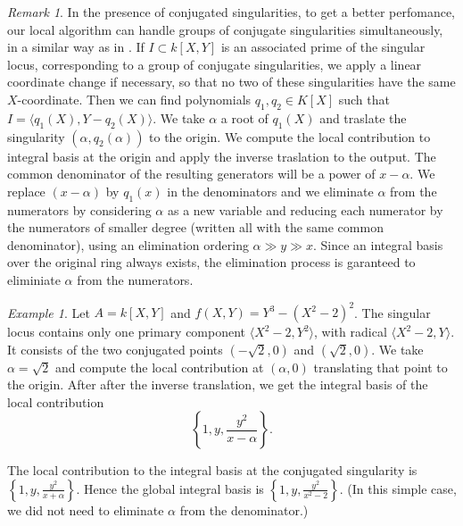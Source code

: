 \documentclass[a4paper,11pt]{amsart}%
\theoremstyle{definition}
\theoremstyle{plain}
\theoremstyle{remark}
\newtheorem{remark}[defn]{Remark}
\newtheorem{example}[defn]{Example}
\begin{document}
\begin{remark}
In the presence of conjugated singularities, to get a better perfomance, our
local algorithm can handle groups of conjugate singularities simultaneously,
in a similar way as in \cite[Section 4]{vanHoeij94}. If $I \subset k[X,Y]$ is
an associated prime of the singular locus, corresponding to a group of
conjugate singularities, we apply a linear coordinate change if necessary, so
that no two of these singularities have the same $X$-coordinate. Then we can
find polynomials $q_{1}, q_{2} \in K[X]$ such that $I = \langle q_{1}(X),
Y-q_{2}(X)\rangle$. We take $\alpha$ a root of $q_{1}(X)$ and traslate the
singularity $(\alpha, q_{2}(\alpha))$ to the origin. We compute the local
contribution to integral basis at the origin and apply the inverse traslation
to the output. The common denominator of the resulting generators will be a
power of $x - \alpha$. We replace $(x-\alpha)$ by $q_{1}(x)$ in the
denominators and we eliminate $\alpha$ from the numerators by considering
$\alpha$ as a new variable and reducing each numerator by the numerators of
smaller degree (written all with the same common denominator), using an
elimination ordering $\alpha\gg y \gg x$. Since an integral basis over the
original ring always exists, the elimination process is garanteed to
eliminiate $\alpha$ from the numerators.
\end{remark}

\begin{example}
Let $A = k[X, Y]$ and $f(X, Y) = Y^{3} - (X^{2}-2)^{2}$. The singular locus
contains only one primary component $\langle X^{2} - 2, Y^{2} \rangle$, with
radical $\langle X^{2} - 2, Y\rangle$. It consists of the two conjugated
points $(-\sqrt{2}, 0)$ and $(\sqrt{2}, 0)$. We take $\alpha= \sqrt{2}$ and
compute the local contribution at $(\alpha, 0)$ translating that point to the
origin. After after the inverse translation, we get the integral basis of the
local contribution
\[
\left\{  1, y, \frac{y^{2}}{x-\alpha}\right\}  .
\]


The local contribution to the integral basis at the conjugated singularity is
$\left\{  1, y, \frac{y^{2}}{x+\alpha}\right\}  $. Hence the global integral
basis is $\left\{  1, y, \frac{y^{2}}{x^{2}-2}\right\}  $. (In this simple
case, we did not need to eliminate $\alpha$ from the denominator.)
\end{example}
\end{document}
